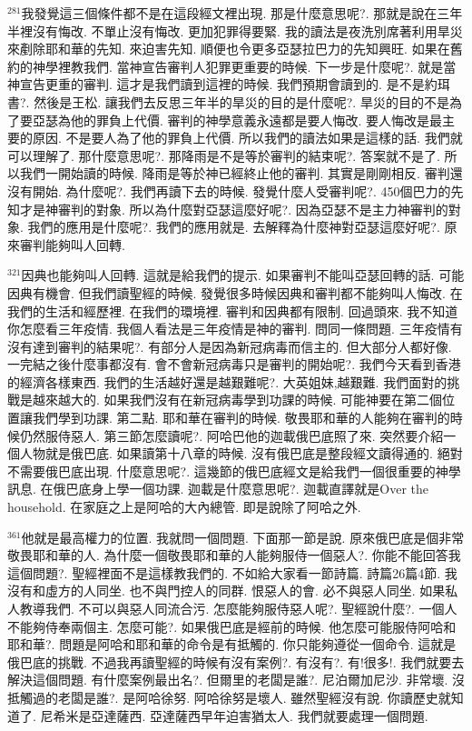 \documentclass{book}
\begin{document}
$^{281}$我發覺這三個條件都不是在這段經文裡出現.
那是什麼意思呢?.
那就是說在三年半裡沒有悔改.
不單止沒有悔改.
更加犯罪得要緊.
我的讀法是夜洗別席著利用旱災來剷除耶和華的先知.
來迫害先知.
順便也令更多亞瑟拉巴力的先知興旺.
如果在舊約的神學裡教我們.
當神宣告審判人犯罪更重要的時候.
下一步是什麼呢?.
就是當神宣告更重的審判.
這才是我們讀到這裡的時候.
我們預期會讀到的.
是不是約珥書?.
然後是王松.
讓我們去反思三年半的旱災的目的是什麼呢?.
旱災的目的不是為了要亞瑟為他的罪負上代價.
審判的神學意義永遠都是要人悔改.
要人悔改是最主要的原因.
不是要人為了他的罪負上代價.
所以我們的讀法如果是這樣的話.
我們就可以理解了.
那什麼意思呢?.
那降雨是不是等於審判的結束呢?.
答案就不是了.
所以我們一開始讀的時候.
降雨是等於神已經終止他的審判.
其實是剛剛相反.
審判還沒有開始.
為什麼呢?.
我們再讀下去的時候.
發覺什麼人受審判呢?.
450個巴力的先知才是神審判的對象.
所以為什麼對亞瑟這麼好呢?.
因為亞瑟不是主力神審判的對象.
我們的應用是什麼呢?.
我們的應用就是.
去解釋為什麼神對亞瑟這麼好呢?.
原來審判能夠叫人回轉.

$^{321}$因典也能夠叫人回轉.
這就是給我們的提示.
如果審判不能叫亞瑟回轉的話.
可能因典有機會.
但我們讀聖經的時候.
發覺很多時候因典和審判都不能夠叫人悔改.
在我們的生活和經歷裡.
在我們的環境裡.
審判和因典都有限制.
回過頭來.
我不知道你怎麼看三年疫情.
我個人看法是三年疫情是神的審判.
問同一條問題.
三年疫情有沒有達到審判的結果呢?.
有部分人是因為新冠病毒而信主的.
但大部分人都好像.
一完結之後什麼事都沒有.
會不會新冠病毒只是審判的開始呢?.
我們今天看到香港的經濟各樣東西.
我們的生活越好還是越艱難呢?.
大英姐妹,越艱難.
我們面對的挑戰是越來越大的.
如果我們沒有在新冠病毒學到功課的時候.
可能神要在第二個位置讓我們學到功課.
第二點.
耶和華在審判的時候.
敬畏耶和華的人能夠在審判的時候仍然服侍惡人.
第三節怎麼讀呢?.
阿哈巴他的迦載俄巴底照了來.
突然要介紹一個人物就是俄巴底.
如果讀第十八章的時候.
沒有俄巴底是整段經文讀得通的.
絕對不需要俄巴底出現.
什麼意思呢?.
這幾節的俄巴底經文是給我們一個很重要的神學訊息.
在俄巴底身上學一個功課.
迦載是什麼意思呢?.
迦載直譯就是Over the household.
在家庭之上是阿哈的大內總管.
即是說除了阿哈之外.

$^{361}$他就是最高權力的位置.
我就問一個問題.
下面那一節是說.
原來俄巴底是個非常敬畏耶和華的人.
為什麼一個敬畏耶和華的人能夠服侍一個惡人?.
你能不能回答我這個問題?.
聖經裡面不是這樣教我們的.
不如給大家看一節詩篇.
詩篇26篇4節.
我沒有和虛方的人同坐.
也不與門控人的同群.
恨惡人的會.
必不與惡人同坐.
如果私人教導我們.
不可以與惡人同流合污.
怎麼能夠服侍惡人呢?.
聖經說什麼?.
一個人不能夠侍奉兩個主.
怎麼可能?.
如果俄巴底是經前的時候.
他怎麼可能服侍阿哈和耶和華?.
問題是阿哈和耶和華的命令是有抵觸的.
你只能夠遵從一個命令.
這就是俄巴底的挑戰.
不過我再讀聖經的時候有沒有案例?.
有沒有?.
有!很多!.
我們就要去解決這個問題.
有什麼案例最出名?.
但爾里的老闆是誰?.
尼泊爾加尼沙.
非常壞.
沒抵觸過的老闆是誰?.
是阿哈徐努.
阿哈徐努是壞人.
雖然聖經沒有說.
你讀歷史就知道了.
尼希米是亞達薩西.
亞達薩西早年迫害猶太人.
我們就要處理一個問題.
\end{document}
